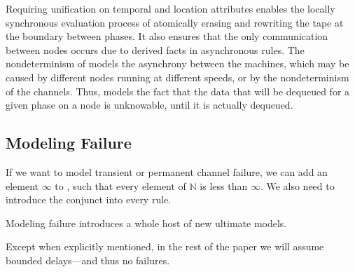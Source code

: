 Requiring unification on temporal and location attributes enables the locally synchronous evaluation process of atomically erasing and rewriting the tape at the boundary between phases.  It also ensures that the only communication between nodes occurs due to derived facts in asynchronous rules.  The nondeterminism of  models the asynchrony between the machines, which may be caused by different nodes running at different speeds, or by the nondeterminism of the channels. Thus,  models the fact that the data that will be dequeued for a given phase on a node is unknowable, until it is actually dequeued.

\subsection{Modeling Failure}

If we want \lang to model transient or permanent channel failure, we can add an element $\infty$ to , such that every element of $\mathbb{N}$ is less than $\infty$.  We also need to introduce the conjunct  into every \lang rule.

Modeling failure introduces a whole host of new ultimate models. 

Except when explicitly mentioned, in the rest of the paper we will assume bounded delays---and thus no failures.

